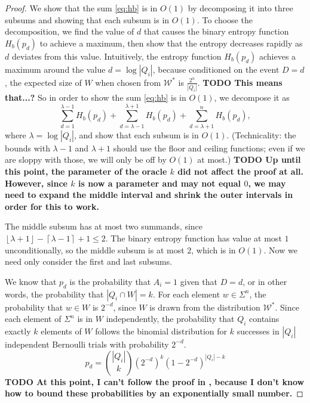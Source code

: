 \documentclass{article}
\newcommand{\todo}[1]{\textbf{TODO #1}}
\newcommand{\mc}{\mathcal}
\newcommand{\floor}[1]{\left\lfloor{#1}\right\rfloor}
\newcommand{\ceil}[1]{\left\lceil{#1}\right\rceil}
\begin{document}
\begin{proof}
  We show that the sum \eqref{eq:hb} is in $O(1)$ by decomposing it into three subsums and showing that each subsum is in $O(1)$.
  To choose the decomposition, we find the value of $d$ that causes the binary entropy function $H_b(p_d)$ to achieve a maximum, then show that the entropy decreases rapidly as $d$ deviates from this value.
  Intuitively, the entropy function $H_b(p_d)$ achieves a maximum around the value $d = \log |Q_i|$, because conditioned on the event $D = d$, the expected size of $W$ when chosen from $\mc{W}^*$ is $\frac{2^n}{|Q_i|}$.
  \todo{This means that...?}
  So in order to show the sum \eqref{eq:hb} is in $O(1)$, we decompose it as
  \begin{equation*}
    \sum_{d = 1}^{\lambda - 1} H_b(p_d) +
    \sum_{d = \lambda - 1}^{\lambda + 1} H_b(p_d) +
    \sum_{d = \lambda + 1}^{n} H_b(p_d),
  \end{equation*}
  where $\lambda = \log |Q_i|$, and show that each subsum is in $O(1)$.
  (Technicality: the bounds with $\lambda - 1$ and $\lambda + 1$ should use the floor and ceiling functions; even if we are sloppy with those, we will only be off by $O(1)$ at most.)
  \todo{
    Up until this point, the parameter of the oracle $k$ did not affect the proof at all.
    However, since $k$ is now a parameter and may not equal $0$, we may need to expand the middle interval and shrink the outer intervals in order for this to work.
  }

  The middle subsum has at most two summands, since $\floor{\lambda + 1} - \ceil{\lambda - 1} + 1 \leq 2$.
  The binary entropy function has value at most $1$ unconditionally, so the middle subsum is at most $2$, which is in $O(1)$.
  Now we need only consider the first and last subsums.

  We know that $p_d$ is the probability that $A_i = 1$ given that $D = d$, or in other words, the probability that $|Q_i \cap W| = k$.
  For each element $w \in \Sigma^n$, the probability that $w \in W$ is $2^{-d}$, since $W$ is drawn from the distribution $\mc{W}^*$.
  Since each element of $\Sigma^n$ is in $W$ independently, the probability that $Q_i$ contains exactly $k$ elements of $W$ follows the binomial distribution for $k$ successes in $|Q_i|$ independent Bernoulli trials with probability $2^{-d}$.
  \begin{equation}
    p_d = \binom{|Q_i|}{k} \left(2^{-d}\right)^k \left(1 - 2^{-d}\right)^{|Q_i| - k}
  \end{equation}
  \todo{At this point, I can't follow the proof in \autocite{krw12}, because I don't know how to bound these probabilities by an exponentially small number.}
\end{proof}
\end{document}
